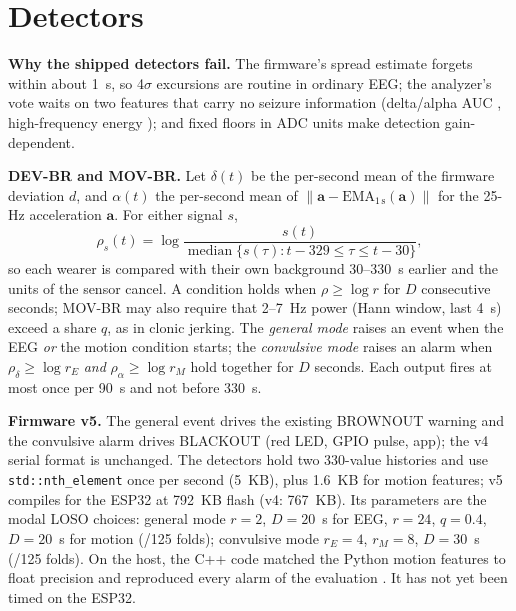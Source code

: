 \documentclass[conference,letterpaper]{IEEEtran}
\begin{document}
\section{Detectors}\label{sec:det}
\textbf{Why the shipped detectors fail.} The firmware's spread estimate forgets within about 1~s, so 4$\sigma$ excursions are routine in ordinary EEG; the analyzer's vote waits on two features that carry no seizure information (delta/alpha AUC \AucDAR{}, high-frequency energy \AucHFE{}); and fixed floors in ADC units make detection gain-dependent.

\textbf{DEV-BR and MOV-BR.} Let $\delta(t)$ be the per-second mean of the firmware deviation $d$, and $\alpha(t)$ the per-second mean of $\lVert \mathbf a - \mathrm{EMA}_{1\,\mathrm s}(\mathbf a)\rVert$ for the 25-Hz acceleration $\mathbf a$. For either signal $s$,
\begin{equation}
\rho_s(t) = \log \frac{s(t)}{\operatorname{median}\{s(\tau): t{-}329 \le \tau \le t{-}30\}},
\end{equation}
so each wearer is compared with their own background 30--330~s earlier and the units of the sensor cancel. A condition holds when $\rho \ge \log r$ for $D$ consecutive seconds; MOV-BR may also require that 2--7~Hz power (Hann window, last 4~s) exceed a share $q$, as in clonic jerking. The \emph{general mode} raises an event when the EEG \emph{or} the motion condition starts; the \emph{convulsive mode} raises an alarm when $\rho_\delta \ge \log r_E$ \emph{and} $\rho_\alpha \ge \log r_M$ hold together for $D$ seconds. Each output fires at most once per 90~s and not before 330~s.

\textbf{Firmware v5.} The general event drives the existing BROWNOUT warning and the convulsive alarm drives BLACKOUT (red LED, GPIO pulse, app); the v4 serial format is unchanged. The detectors hold two 330-value histories and use \texttt{std::nth\_element} once per second (5~KB), plus 1.6~KB for motion features; v5 compiles for the ESP32 at 792~KB flash (v4: 767~KB). Its parameters are the modal LOSO choices: general mode $r{=}2$, $D{=}20$~s for EEG, $r{=}24$, $q{=}0.4$, $D{=}20$~s for motion (\SFusAParamsN{}/125 folds); convulsive mode $r_E{=}4$, $r_M{=}8$, $D{=}30$~s (\SCvAParamsN{}/125 folds). On the host, the C++ code matched the Python motion features to float precision and reproduced every alarm of the evaluation \SVerNote{}. It has not yet been timed on the ESP32.

\end{document}
